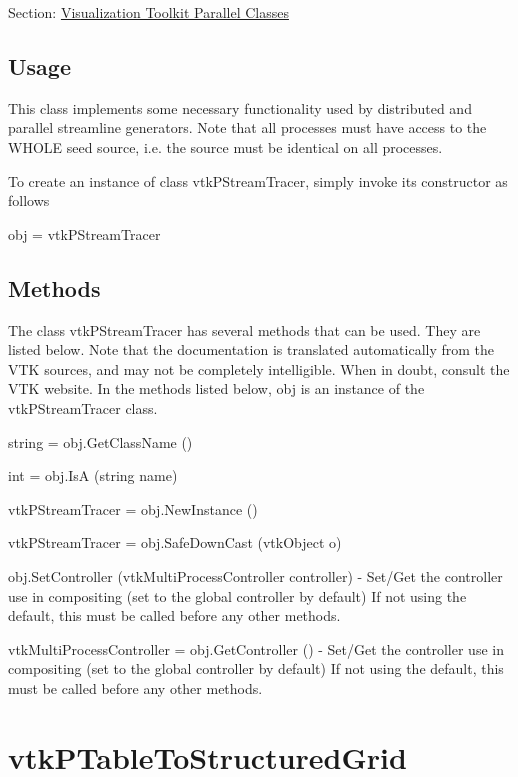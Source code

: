 Section\-: \hyperlink{sec_vtkparallel}{Visualization Toolkit Parallel Classes} \hypertarget{vtkwidgets_vtkxyplotwidget_Usage}{}\subsection{Usage}\label{vtkwidgets_vtkxyplotwidget_Usage}
This class implements some necessary functionality used by distributed and parallel streamline generators. Note that all processes must have access to the W\-H\-O\-L\-E seed source, i.\-e. the source must be identical on all processes.

To create an instance of class vtk\-P\-Stream\-Tracer, simply invoke its constructor as follows \begin{DoxyVerb}  obj = vtkPStreamTracer
\end{DoxyVerb}
 \hypertarget{vtkwidgets_vtkxyplotwidget_Methods}{}\subsection{Methods}\label{vtkwidgets_vtkxyplotwidget_Methods}
The class vtk\-P\-Stream\-Tracer has several methods that can be used. They are listed below. Note that the documentation is translated automatically from the V\-T\-K sources, and may not be completely intelligible. When in doubt, consult the V\-T\-K website. In the methods listed below, {\ttfamily obj} is an instance of the vtk\-P\-Stream\-Tracer class. 
\begin{DoxyItemize}
\item {\ttfamily string = obj.\-Get\-Class\-Name ()}  
\item {\ttfamily int = obj.\-Is\-A (string name)}  
\item {\ttfamily vtk\-P\-Stream\-Tracer = obj.\-New\-Instance ()}  
\item {\ttfamily vtk\-P\-Stream\-Tracer = obj.\-Safe\-Down\-Cast (vtk\-Object o)}  
\item {\ttfamily obj.\-Set\-Controller (vtk\-Multi\-Process\-Controller controller)} -\/ Set/\-Get the controller use in compositing (set to the global controller by default) If not using the default, this must be called before any other methods.  
\item {\ttfamily vtk\-Multi\-Process\-Controller = obj.\-Get\-Controller ()} -\/ Set/\-Get the controller use in compositing (set to the global controller by default) If not using the default, this must be called before any other methods.  
\end{DoxyItemize}\hypertarget{vtkparallel_vtkptabletostructuredgrid}{}\section{vtk\-P\-Table\-To\-Structured\-Grid}\label{vtkparallel_vtkptabletostructuredgrid}
